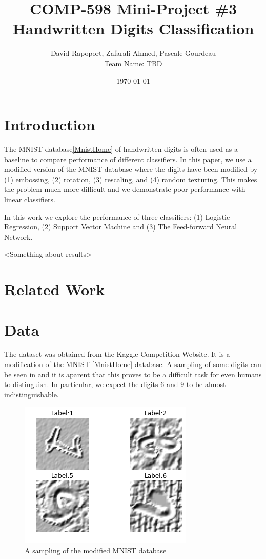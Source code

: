 \documentclass[conference]{IEEEtran}
\author{David Rapoport, Zafarali Ahmed, Pascale Gourdeau\\Team Name: TBD}
\title{COMP-598 Mini-Project \#3\\Handwritten Digits Classification}
\date{\today}
\begin{document}
\maketitle

\section{Introduction}
The MNIST database\ref{MnistHome} of handwritten digits is often used as a baseline to compare performance of different classifiers. In this paper, we use a modified version of the MNIST database where the digits have been modified by (1) embossing, (2) rotation, (3) rescaling, and (4) random texturing. This makes the problem much more difficult and we demonstrate poor performance with linear classifiers.

In this work we explore the performance of three classifiers: (1) Logistic Regression, (2) Support Vector Machine and (3) The Feed-forward Neural Network. 

<Something about results>


\section{Related Work}




\section{Data}
The dataset was obtained from the Kaggle Competition Website. It is a modification of the MNIST \ref{MnistHome} database. A sampling of some digits can be seen in  and it is aparent that this proves to be a difficult task for even humans to distinguish. In particular, we expect the digits $6$ and $9$ to be almost indistinguishable.



\begin{figure}[H]
	\centering
	\includegraphics[scale=0.40]{sample_of_images.png}
	\caption{A sampling of the modified MNIST database}
	\label{MNISTSample}
\end{figure}
\end{document}
